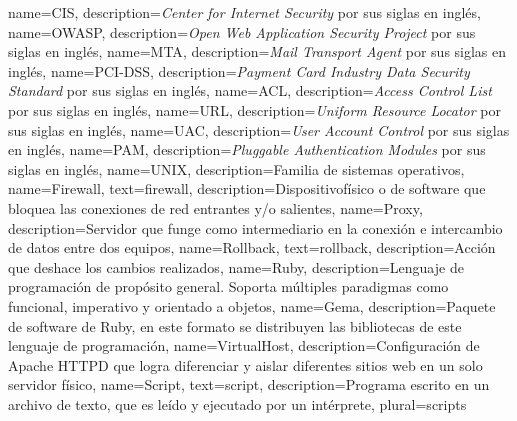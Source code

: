 {
  name={CIS},
  description={\textit{Center for Internet Security} por sus siglas en ingl\'{e}s},
}
{
  name={OWASP},
  description={\textit{Open Web Application Security Project} por sus siglas en ingl\'{e}s},
}
{
  name={MTA},
  description={\textit{Mail Transport Agent} por sus siglas en ingl\'{e}s},
}
{
  name={PCI-DSS},
  description={\textit{Payment Card Industry Data Security Standard} por sus siglas en ingl\'{e}s},
}
{
  name={ACL},
  description={\textit{Access Control List} por sus siglas en ingl\'{e}s},
}
{
  name={URL},
  description={\textit{Uniform Resource Locator} por sus siglas en ingl\'{e}s},
}
{
  name={UAC},
  description={\textit{User Account Control} por sus siglas en ingl\'{e}s},
}
{
  name={PAM},
  description={\textit{Pluggable Authentication Modules} por sus siglas en ingl\'{e}s},
}
%
{
  name={UNIX},
  description={Familia de sistemas operativos},
}
{
  name={Firewall},
  text={firewall},
  description={Dispositivof\'{i}sico o de software que bloquea las conexiones de red entrantes y/o salientes},
}
{
  name={Proxy},
  description={Servidor que funge como intermediario en la conexi\'{o}n e intercambio de datos entre dos equipos},
}
{
  name={Rollback},
  text={rollback},
  description={Acci\'{o}n que deshace los cambios realizados},
}
{
  name={Ruby},
  description={Lenguaje de programaci\'{o}n de prop\'{o}sito general. Soporta m\'{u}ltiples paradigmas como funcional, imperativo y orientado a objetos},
}
{
  name={Gema},
  description={Paquete de software de \Gls{Ruby}, en este formato se distribuyen las bibliotecas de este lenguaje de programaci\'{o}n},
}
{
  name={VirtualHost},
  description={Configuraci\'{o}n de Apache \textsc{HTTPD} que logra diferenciar y aislar diferentes sitios web en un solo servidor f\'{i}sico},
}
{
  name={Script},
  text={script},
  description={Programa escrito en un archivo de texto, que es le\'{i}do y ejecutado por un int\'{e}rprete},
  plural={scripts}
}
